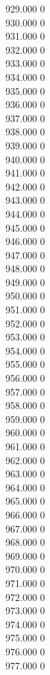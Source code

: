 { 929.000	0 \\
 930.000	0 \\
 931.000	0 \\
 932.000	0 \\
 933.000	0 \\
 934.000	0 \\
 935.000	0 \\
 936.000	0 \\
 937.000	0 \\
 938.000	0 \\
 939.000	0 \\
 940.000	0 \\
 941.000	0 \\
 942.000	0 \\
 943.000	0 \\
 944.000	0 \\
 945.000	0 \\
 946.000	0 \\
 947.000	0 \\
 948.000	0 \\
 949.000	0 \\
 950.000	0 \\
 951.000	0 \\
 952.000	0 \\
 953.000	0 \\
 954.000	0 \\
 955.000	0 \\
 956.000	0 \\
 957.000	0 \\
 958.000	0 \\
 959.000	0 \\
 960.000	0 \\
 961.000	0 \\
 962.000	0 \\
 963.000	0 \\
 964.000	0 \\
 965.000	0 \\
 966.000	0 \\
 967.000	0 \\
 968.000	0 \\
 969.000	0 \\
 970.000	0 \\
 971.000	0 \\
 972.000	0 \\
 973.000	0 \\
 974.000	0 \\
 975.000	0 \\
 976.000	0 \\
 977.000	0 \\
}
